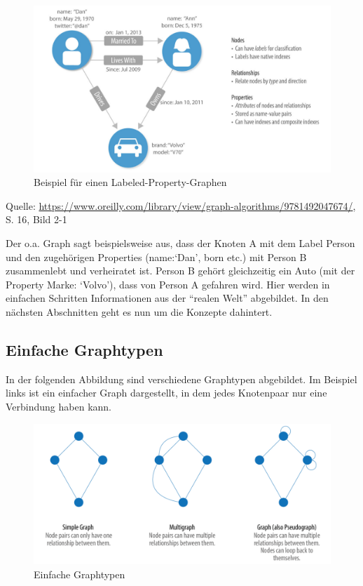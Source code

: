 \documentclass[ngerman,]{scrreprt}
\begin{document}
\begin{figure}
\centering
\includegraphics{Bilder/Graph-Algorithms/16-2-1-LabeledPropertyGraph.png}
\caption{Beispiel für einen Labeled-Property-Graphen}
\end{figure}

Quelle: \href{Needham/Hodler\%202019}{https://www.oreilly.com/library/view/graph-algorithms/9781492047674/}, S. 16, Bild 2-1

Der o.a. Graph sagt beispielsweise aus, dass der Knoten A mit dem Label Person und den zugehörigen Properties (name:`Dan', born etc.) mit Person B zusammenlebt und verheiratet ist. Person B gehört gleichzeitig ein Auto (mit der Property Marke: `Volvo'), dass von Person A gefahren wird. Hier werden in einfachen Schritten Informationen aus der ``realen Welt'' abgebildet. In den nächsten Abschnitten geht es nun um die Konzepte dahintert.

\subsection{Einfache Graphtypen}\label{einfache-graphtypen}

In der folgenden Abbildung sind verschiedene Graphtypen abgebildet. Im Beispiel links ist ein einfacher Graph dargestellt, in dem jedes Knotenpaar nur eine Verbindung haben kann.

\begin{figure}
\centering
\includegraphics{Bilder/Graph-Algorithms/17-2-2-TypesOfGraphs.png}
\caption{Einfache Graphtypen}
\end{figure}
\end{document}
